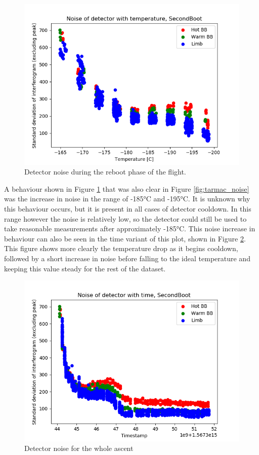 \begin{figure}
\centering
  \includegraphics[width=0.8\linewidth]{mct_noise_temp_plots/SecondBoot_noisevtemp_invertedx_colours.png}
  \caption{Detector noise during the reboot phase of the flight.}
  \label{fig:secondboot_noise}
\end{figure}

A behaviour shown in Figure \ref{fig:secondboot_noise} that was also clear in Figure \ref{fig:tarmac_noise} was the increase in noise in the range of -185°C and -195°C. It is unknown why this behaviour occurs, but it is present in all cases of detector cooldown. In this range however the noise is relatively low, so the detector could still be used to take reasonable measurements after approximately -185°C. This noise increase in behaviour can also be seen in the time variant of this plot, shown in Figure \ref{fig:secondboot_noisetime}. This figure shows more clearly the temperature drop as it begins cooldown, followed by a short increase in noise before falling to the ideal temperature and keeping this value steady for the rest of the dataset.

\begin{figure}
\centering
  \includegraphics[width=0.8\linewidth]{mct_noise_temp_plots/SecondBoot_full_noisevtime_colours.png}
  \caption{Detector noise for the whole ascent}
  \label{fig:secondboot_noisetime}
\end{figure}

